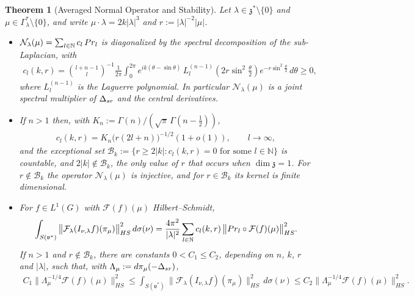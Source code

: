\documentclass[11pt]{amsart}
\theoremstyle{plain}
\newtheorem{theorem}{Theorem}[section]
\theoremstyle{definition}
\theoremstyle{remark}
\numberwithin{equation}{section}
\def\fz{\mathfrak{z}}
\def\fv{\mathfrak{v}}
\def\cB{\mathcal{B}}
\def\cN{\mathcal{N}}
\def\cF{\mathcal{F}}
\def\mz{\setminus\{0\}}
\def\N{{\mathbb N}}%
\numberwithin{equation}{section}
\begin{document}
\begin{theorem}[Averaged Normal Operator and Stability]\label{t:stability}
	Let $\lambda\in \fz^*\mz$ and $\mu\in \Gamma_\lambda^*\mz$, and write $\mu\cdot\lambda=2k|\lambda|^3$ and $r:=|\lambda|^{-2}|\mu|$.
	\begin{itemize}
		\item[1.] $\cN_\lambda(\mu)=\sum_{l\in \N}c_l\, {\rm Pr}_l$ is diagonalized by the spectral decomposition of the sub-Laplacian, with
		\begin{align}\label{e:mainAvgDiag}
			c_l(k, r)=\binom{l+n-1}{l}^{-1}\frac{1}{2\pi}\int_0^{2\pi}e^{ik(\theta-\sin\theta)}\,L_l^{(n-1)}\!\left(2r\sin^2\tfrac{\theta}{2}\right)e^{-r\sin^2\frac{\theta}{2}}\,d\theta\geq 0,
		\end{align}
		where $L_l^{(n-1)}$ is the Laguerre polynomial. In particular $\cN_\lambda(\mu)$ is a joint spectral multiplier of $\Delta_{\rm{sr}}$ and the central derivatives.
		\item[2.] If $n>1$ then, with $K_n:=\Gamma(n)/(\sqrt{\pi}\,\Gamma(n-\tfrac12))$,
		\begin{align}\label{e:mainAsymp}
			c_l(k, r)=K_n\big(r(2l+n)\big)^{-1/2}(1+o(1)), \qquad l\to\infty,
		\end{align}
		and the exceptional set $\cB_k:=\{r\geq 2|k|: c_l(k, r)=0 \text{ for some } l\in \N\}$ is countable, and $2|k|\notin\cB_k$, the only value of $r$ that occurs when $\dim\fz=1$. For $r\notin\cB_k$ the operator $\cN_\lambda(\mu)$ is injective, and for $r\in \cB_k$ its kernel is finite dimensional.
		\item[3.] For $f\in L^1(G)$ with $\cF(f)(\mu)$ Hilbert--Schmidt,
		\begin{align}\label{e:mainStabId}
			\int_{S(\fv^*)}\big\|\cF_\lambda(I_{\nu, \lambda}f)(\pi_\mu)\big\|_{HS}^2\, d\sigma(\nu)=\frac{4\pi^2}{|\lambda|^2}\sum_{l\in \N}c_l(k, r)\,\big\|{\rm Pr}_l\circ\cF(f)(\mu)\big\|_{HS}^2.
		\end{align}
		If $n>1$ and $r\notin\cB_k$, there are constants $0<C_1\leq C_2$, depending on $n$, $k$, $r$ and $|\lambda|$, such that, with $\Lambda_\mu:=d\pi_\mu(-\Delta_{\rm{sr}})$,
		\begin{align}\label{e:mainStab}
			C_1\big\|\Lambda_\mu^{-1/4}\cF(f)(\mu)\big\|_{HS}^2\leq\int_{S(\fv^*)}\big\|\cF_\lambda(I_{\nu, \lambda}f)(\pi_\mu)\big\|_{HS}^2\, d\sigma(\nu)\leq C_2\big\|\Lambda_\mu^{-1/4}\cF(f)(\mu)\big\|_{HS}^2.
		\end{align}
	\end{itemize}
\end{theorem}
\end{document}
